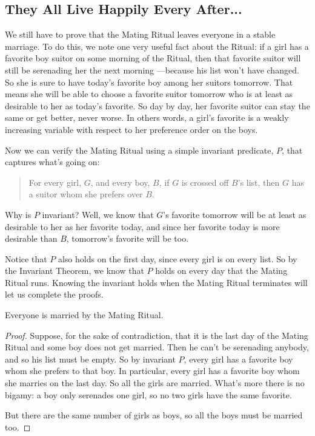 \subsection{They All Live Happily Every After...}

We still have to prove that the Mating Ritual leaves everyone in a
stable marriage.  To do this, we note one very useful fact about the
Ritual: if a girl has a favorite boy suitor on some morning of the Ritual,
then that favorite suitor will still be serenading her the next morning
---because his list won't have changed.  So she is sure to have today's
favorite boy among her suitors tomorrow.  That means she will be able to
choose a favorite suitor tomorrow who is at least as desirable to her as
today's favorite.  So day by day, her favorite suitor can stay the same or
get better, never worse.  In others words, a girl's favorite is a weakly
increasing variable with respect to her preference order on the boys.

Now we can verify the Mating Ritual using a simple invariant predicate,
$P$, that captures what's going on:
\begin{quotation}
  For every girl, $G$, and every boy, $B$, if $G$ is crossed off $B$'s
  list, then $G$ has a suitor whom she prefers over $B$.
\end{quotation}

Why is $P$ invariant?  Well, we know that $G$'s favorite tomorrow will be
at least as desirable to her as her favorite today, and since her favorite
today is more desirable than $B$, tomorrow's favorite will be too.

Notice that $P$ also holds on the first day, since every girl is on every
list.  So by the Invariant Theorem, we know that $P$ holds on every day
that the Mating Ritual runs.  Knowing the invariant holds when the
Mating Ritual terminates will let us complete the proofs.

\begin{theorem}
Everyone is married by the Mating Ritual.
\end{theorem}

\begin{proof}
  Suppose, for the sake of contradiction, that it is the last day of
  the Mating Ritual and some boy does not get married.  Then he can't
  be serenading anybody, and so his list must be empty.  So by invariant
  $P$, every girl has a favorite boy whom she prefers to that boy.  In
  particular, every girl has a favorite boy whom she marries on the
  last day.  So all the girls are married.  What's more there is no
  bigamy: a boy only serenades one girl, so no two girls have the same
  favorite.

But there are the same number of girls as boys, so all the boys must be
married too.
\end{proof}

